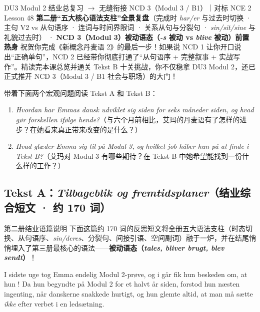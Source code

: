 {DU3 Modul 2 结业总复习 $\rightarrow$ 无缝衔接 NCD 3（Modul 3 / B1）｜对标 NCE 2 Lesson 48}
{\textbf{第二册“五大核心语法支柱”全景复盘}（完成时 \textit{har/er} 与过去时切换 · 主句 V2 vs 从句语序 · 连词与时间界限词 · 关系从句与分裂句 · \textit{sin/sit/sine} 与礼貌过去时） · \textbf{NCD 3（Modul 3）被动语态（\textit{-s} 被动 vs \textit{blive} 被动）前置热身}}
{祝贺你完成《新概念丹麦语 2》的最后一步！如果说 NCD 1 让你开口说出“正确单句”，NCD 2 已经带你彻底打通了“从句语序 + 完整叙事 + 实战写作”。精读完本课总览并通关 Tekst B 十关挑战，你不仅稳拿 DU3 Modul 2，还已正式推开 NCD 3（Modul 3 / B1 社会与职场）的大门！}

\begin{foerduleaeser}
带着下面两个宏观问题阅读 Tekst A 和 Tekst B：
\begin{enumerate}
  \item \textit{Hvordan har Emmas dansk udviklet sig siden for seks måneder siden, og hvad gør forskellen ifølge hende?}（与六个月前相比，艾玛的丹麦语有了怎样的进步？在她看来真正带来改变的是什么？）
  \item \textit{Hvad glæder Emma sig til på Modul 3, og hvilket job håber hun på at finde i Tekst B?}（艾玛对 Modul 3 有哪些期待？在 Tekst B 中她希望能找到一份什么样的工作？）
\end{enumerate}
\end{foerduleaeser}


\subsection*{Tekst A：\textit{Tilbageblik og fremtidsplaner}（结业综合短文 · 约 170 词）}

\begin{tipbox}{第二册结业语篇说明}
下面这篇约 170 词的反思短文将全册五大语法支柱（时态切换、从句语序、\textit{sin/deres}、分裂句、间接引语、空间副词）融于一炉，并在结尾悄悄埋入了第三册最核心的语法——\textbf{\color{NCDRed}被动语态（\textit{tales, bliver brugt, blev sendt}）}！
\end{tipbox}

I sidste uge tog Emma endelig  Modul 2-prøve, og i går fik hun beskeden om, at hun ! Da hun begyndte på Modul 2 for et halvt år siden, forstod hun næsten ingenting, når danskerne snakkede hurtigt, og hun glemte altid, at man  må sætte \textit{ikke} efter verbet i en ledsætning.

